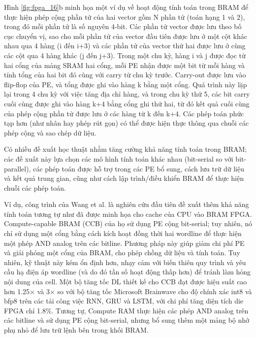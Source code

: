 \documentclass[a4paper]{article}
\begin{document}
Hình \ref{fig:fpga_16}b minh họa một ví dụ về hoạt động tính toán trong BRAM để thực hiện phép cộng phần tử của hai vector gồm N phần tử (toán hạng 1 và 2), trong đó mỗi phần tử là số nguyên 4-bit. Các phần tử vector được lưu theo bố cục chuyển vị, sao cho mỗi phần tử của vector đầu tiên được lưu ở một cột khác nhau qua 4 hàng (i đến i+3) và các phần tử của vector thứ hai được lưu ở cùng các cột qua 4 hàng khác (j đến j+3). Trong một chu kỳ, hàng i và j được đọc từ hai cổng của mảng SRAM hai cổng, mỗi PE nhận được một bit từ mỗi hàng và tính tổng của hai bit đó cùng với carry từ chu kỳ trước. Carry-out được lưu vào flip-flop của PE, và tổng được ghi vào hàng k bằng một cổng. Quá trình này lặp lại trong 4 chu kỳ với việc tăng địa chỉ hàng, và trong chu kỳ thứ 5, các bit carry cuối cùng được ghi vào hàng k+4 bằng cổng ghi thứ hai, từ đó kết quả cuối cùng của phép cộng phần tử được lưu ở các hàng từ k đến k+4. Các phép toán phức tạp hơn (như nhân hay phép rút gọn) có thể được hiện thực thông qua chuỗi các phép cộng và sao chép dữ liệu.

Có nhiều đề xuất học thuật nhằm tăng cường khả năng tính toán trong BRAM; các đề xuất này lựa chọn các mô hình tính toán khác nhau (bit-serial so với bit-parallel), các phép toán được hỗ trợ trong các PE bổ sung, cách lưu trữ dữ liệu và kết quả trung gian, cũng như cách lập trình/điều khiển BRAM để thực hiện chuỗi các phép toán. 

Ví dụ, công trình của Wang et al. là nghiên cứu đầu tiên đề xuất thêm khả năng tính toán tương tự như đã được minh họa cho cache của CPU vào BRAM FPGA. Compute-capable BRAM (CCB) của họ sử dụng PE cộng bit-serial; tuy nhiên, nó chỉ sử dụng một cổng bằng cách kích hoạt đồng thời hai wordline để thực hiện một phép AND analog trên các bitline. Phương pháp này giúp giảm chi phí PE và giải phóng một cổng của BRAM, cho phép chồng dữ liệu và tính toán. Tuy nhiên, kỹ thuật này kém ổn định hơn, nhạy cảm với biến thiên quy trình và yêu cầu hạ điện áp wordline (và do đó tần số hoạt động thấp hơn) để tránh làm hỏng nội dung của cell. Một bộ tăng tốc DL thiết kế cho CCB đạt được hiệu suất cao hơn 1.25× và 3× so với bộ tăng tốc Microsoft Brainwave cho độ chính xác int8 và bfp8 trên các tải công việc RNN, GRU và LSTM, với chi phí tăng diện tích die FPGA chỉ 1.8\%. Tương tự, Compute RAM thực hiện các phép AND analog trên các bitline và sử dụng PE cộng bit-serial, nhưng bổ sung thêm một mảng bộ nhớ phụ nhỏ để lưu trữ lệnh bên trong khối BRAM.
\end{document}
